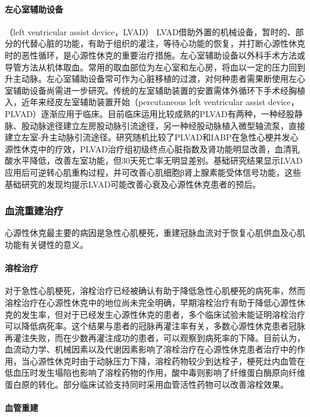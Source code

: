 \paragraph{左心室辅助设备}

（left ventricular assist device，LVAD）
LVAD借助外置的机械设备，暂时的、部分的代替心脏的功能，有助于组织的灌注，等待心功能的恢复，并打断心源性休克时的恶性循环，是心源性休克的重要治疗措施。左心室辅助设备以外科手术方法或导管方法从机体取血。常用的取血部位为左心室和左心房，将血以一定的压力回到升主动脉。左心室辅助设备常可作为心脏移植的过渡，对何种患者需果断使用左心室辅助设备尚需进一步研究。传统的左室辅助装置的安置需体外循环下手术经胸植入，近年来经皮左室辅助装置开始（percutaneous
left ventricular assist
device，PLVAD）逐渐应用于临床。目前临床运用比较成熟的PLVAD有两种，一种经股静脉、股动脉途径建立左房股动脉引流途径，另一种经股动脉植入微型轴流泵，直接建立左室-升主动脉引流途径。研究随机比较了PLVAD和IABP在急性心梗并发心源性休克中的疗效，PLVAD治疗组初级终点心脏指数及肾功能明显改善，血清乳酸水平降低，改善左室功能，但30天死亡率无明显差别。基础研究结果显示LVAD应用后可逆转心肌重构过程，并可改善心肌细胞β肾上腺素能受体信号功能，这些基础研究的发现均提示LVAD可能改善心衰及心源性休克患者的预后。

\subsubsection{血流重建治疗}

心源性休克最主要的病因是急性心肌梗死，重建冠脉血流对于恢复心肌供血及心肌功能有关键性的意义。

\paragraph{溶栓治疗}

对于急性心肌梗死，溶栓治疗已经被确认有助于降低急性心肌梗死的病死率，然而溶栓治疗在心源性休克中的地位尚未完全明确，早期溶栓治疗有助于降低心源性休克的发生率，但对于已经发生心源性休克的患者，多个临床试验未能证明溶栓治疗可以降低病死率。这个结果与患者的冠脉再灌注率有关，多数心源性休克患者冠脉再灌注失败，而在少数再灌注成功的患者，可以观察到病死率的下降。目前认为，血流动力学、机械因素以及代谢因素影响了溶栓治疗在心源性休克患者治疗中的作用，当心源性休克时由于动脉压力下降，溶栓药物较少到达栓子，梗死灶内血管在低血压时发生塌陷也影响了溶栓药物的作用，酸中毒则影响了纤维蛋白酶原向纤维蛋白原的转化。部分临床试验支持同时采用血管活性药物可以改善溶栓效果。

\paragraph{血管重建}


